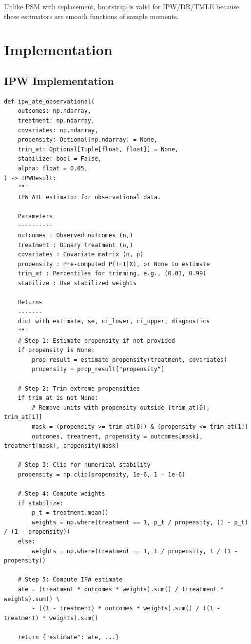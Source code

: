 Unlike PSM with replacement, bootstrap is valid for IPW/DR/TMLE because these estimators are smooth functions of sample moments.

\section{Implementation}
\label{sec:weighting_implementation}

\subsection{IPW Implementation}

\begin{verbatim}
def ipw_ate_observational(
    outcomes: np.ndarray,
    treatment: np.ndarray,
    covariates: np.ndarray,
    propensity: Optional[np.ndarray] = None,
    trim_at: Optional[Tuple[float, float]] = None,
    stabilize: bool = False,
    alpha: float = 0.05,
) -> IPWResult:
    """
    IPW ATE estimator for observational data.

    Parameters
    ----------
    outcomes : Observed outcomes (n,)
    treatment : Binary treatment (n,)
    covariates : Covariate matrix (n, p)
    propensity : Pre-computed P(T=1|X), or None to estimate
    trim_at : Percentiles for trimming, e.g., (0.01, 0.99)
    stabilize : Use stabilized weights

    Returns
    -------
    dict with estimate, se, ci_lower, ci_upper, diagnostics
    """
    # Step 1: Estimate propensity if not provided
    if propensity is None:
        prop_result = estimate_propensity(treatment, covariates)
        propensity = prop_result["propensity"]

    # Step 2: Trim extreme propensities
    if trim_at is not None:
        # Remove units with propensity outside [trim_at[0], trim_at[1]]
        mask = (propensity >= trim_at[0]) & (propensity <= trim_at[1])
        outcomes, treatment, propensity = outcomes[mask], treatment[mask], propensity[mask]

    # Step 3: Clip for numerical stability
    propensity = np.clip(propensity, 1e-6, 1 - 1e-6)

    # Step 4: Compute weights
    if stabilize:
        p_t = treatment.mean()
        weights = np.where(treatment == 1, p_t / propensity, (1 - p_t) / (1 - propensity))
    else:
        weights = np.where(treatment == 1, 1 / propensity, 1 / (1 - propensity))

    # Step 5: Compute IPW estimate
    ate = (treatment * outcomes * weights).sum() / (treatment * weights).sum() \
        - ((1 - treatment) * outcomes * weights).sum() / ((1 - treatment) * weights).sum()

    return {"estimate": ate, ...}
\end{verbatim}

